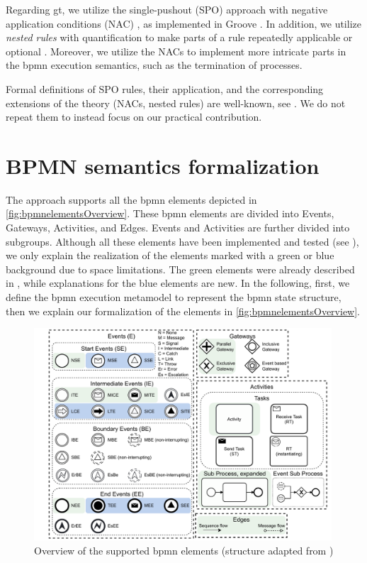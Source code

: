 \documentclass{lmcs} %
\theoremstyle{plain}\newtheorem{satz}[thm]{Satz} %
\begin{document}
Regarding \gls*{gt}, we utilize the single-pushout (SPO) approach with negative application conditions (NAC) \cite{ehrigALGEBRAICAPPROACHESGRAPH1997}, as implemented in Groove \cite{rensinkGROOVESimulatorTool2004}.
In addition, we utilize \textit{nested rules} with quantification to make parts of a rule repeatedly applicable or optional \cite{rensinkNestedQuantificationGraph2006,rensinkHowMuchAre2017}.
Moreover, we utilize the NACs to implement more intricate parts in the \gls*{bpmn} execution semantics, such as the termination of processes.

Formal definitions of SPO rules, their application, and the corresponding extensions of the theory (NACs, nested rules) are well-known, see \cite{ehrigALGEBRAICAPPROACHESGRAPH1997,rensinkNestedQuantificationGraph2006}.
We do not repeat them to instead focus on our practical contribution.


\section{BPMN semantics formalization} \label{sec:formalization}

The approach supports all the \gls*{bpmn} elements depicted in \autoref{fig:bpmnelementsOverview}.
These \gls*{bpmn} elements are divided into \textsf{Events}, \textsf{Gateways}, \textsf{Activities}, and \textsf{Edges}.
\textsf{Events} and \textsf{Activities} are further divided into subgroups.
Although all these elements have been implemented and tested (see \cite{krauterArtifactsLMCS2023}), we only explain the realization of the elements marked with a green or blue background due to space limitations.
The green elements were already described in \cite{krauterFormalizationAnalysisBPMN2023}, while explanations for the blue elements are new.
In the following, first, we define the \gls*{bpmn} execution metamodel to represent the \gls*{bpmn} state structure, then we explain our formalization of the elements in \autoref{fig:bpmnelementsOverview}.


\begin{figure}[ht]
    \centering
    \includegraphics[width=0.99\textwidth]{images/bpmn_semantics-elements-overview.pdf}
    \caption{Overview of the supported \gls*{bpmn} elements (structure adapted from \cite{houhouFirstOrderLogicVerification2022})}
    \label{fig:bpmnelementsOverview}
\end{figure}
\end{document}
